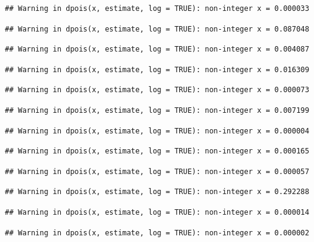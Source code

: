 \documentclass[]{article}
\begin{document}
\begin{verbatim}
## Warning in dpois(x, estimate, log = TRUE): non-integer x = 0.000033
\end{verbatim}

\begin{verbatim}
## Warning in dpois(x, estimate, log = TRUE): non-integer x = 0.087048
\end{verbatim}

\begin{verbatim}
## Warning in dpois(x, estimate, log = TRUE): non-integer x = 0.004087
\end{verbatim}

\begin{verbatim}
## Warning in dpois(x, estimate, log = TRUE): non-integer x = 0.016309
\end{verbatim}

\begin{verbatim}
## Warning in dpois(x, estimate, log = TRUE): non-integer x = 0.000073
\end{verbatim}

\begin{verbatim}
## Warning in dpois(x, estimate, log = TRUE): non-integer x = 0.007199
\end{verbatim}

\begin{verbatim}
## Warning in dpois(x, estimate, log = TRUE): non-integer x = 0.000004
\end{verbatim}

\begin{verbatim}
## Warning in dpois(x, estimate, log = TRUE): non-integer x = 0.000165
\end{verbatim}

\begin{verbatim}
## Warning in dpois(x, estimate, log = TRUE): non-integer x = 0.000057
\end{verbatim}

\begin{verbatim}
## Warning in dpois(x, estimate, log = TRUE): non-integer x = 0.292288
\end{verbatim}

\begin{verbatim}
## Warning in dpois(x, estimate, log = TRUE): non-integer x = 0.000014
\end{verbatim}

\begin{verbatim}
## Warning in dpois(x, estimate, log = TRUE): non-integer x = 0.000002
\end{verbatim}
\end{document}
